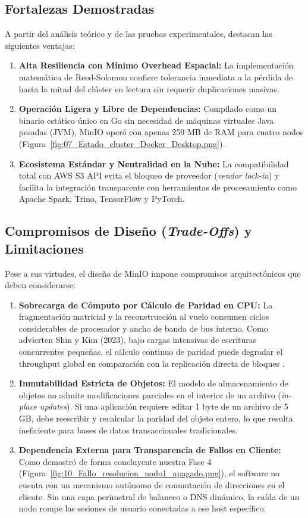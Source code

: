 \documentclass[12pt,a4paper]{article}
\begin{document}
\subsection{Fortalezas Demostradas}
A partir del análisis teórico y de las pruebas experimentales, destacan las siguientes ventajas:
\begin{enumerate}[leftmargin=*]
    \item \textbf{Alta Resiliencia con Mínimo Overhead Espacial:} La implementación matemática de Reed-Solomon confiere tolerancia inmediata a la pérdida de hasta la mitad del clúster en lectura sin requerir duplicaciones masivas.
    \item \textbf{Operación Ligera y Libre de Dependencias:} Compilado como un binario estático único en Go sin necesidad de máquinas virtuales Java pesadas (JVM), MinIO operó con apenas 259 MB de RAM para cuatro nodos (Figura~\ref{fig:07_Estado_cluster_Docker_Desktop.png}).
    \item \textbf{Ecosistema Estándar y Neutralidad en la Nube:} La compatibilidad total con AWS S3 API evita el bloqueo de proveedor (\emph{vendor lock-in}) y facilita la integración transparente con herramientas de procesamiento como Apache Spark, Trino, TensorFlow y PyTorch.
\end{enumerate}

\subsection{Compromisos de Diseño (\emph{Trade-Offs}) y Limitaciones}
Pese a sus virtudes, el diseño de MinIO impone compromisos arquitectónicos que deben considerarse:
\begin{enumerate}[leftmargin=*]
    \item \textbf{Sobrecarga de Cómputo por Cálculo de Paridad en CPU:} La fragmentación matricial y la reconstrucción al vuelo consumen ciclos considerables de procesador y ancho de banda de bus interno. Como advierten Shin y Kim (2023), bajo cargas intensivas de escrituras concurrentes pequeñas, el cálculo continuo de paridad puede degradar el throughput global en comparación con la replicación directa de bloques \cite{shin2023cache}.
    \item \textbf{Inmutabilidad Estricta de Objetos:} El modelo de almacenamiento de objetos no admite modificaciones parciales en el interior de un archivo (\emph{in-place updates}). Si una aplicación requiere editar 1 byte de un archivo de 5 GB, debe reescribir y recalcular la paridad del objeto entero, lo que resulta ineficiente para bases de datos transaccionales tradicionales.
    \item \textbf{Dependencia Externa para Transparencia de Fallos en Cliente:} Como demostró de forma concluyente nuestra Fase 4 (Figura~\ref{fig:10_Fallo_resolucion_nodo1_apagado.png}), el software no cuenta con un mecanismo autónomo de conmutación de direcciones en el cliente. Sin una capa perimetral de balanceo o DNS dinámico, la caída de un nodo rompe las sesiones de usuario conectadas a ese host específico.
\end{enumerate}
\end{document}
